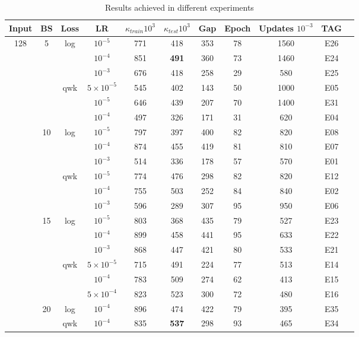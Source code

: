 \documentclass{IOS-Book-Article}
\begin{document}
\begin{table}[h!]
	\centering
	\caption{Results achieved in different experiments}
	\label{tab:qwk_cv}
	\begin{tabular}{c|c|c|c|c|c|c|c|c|c|c}
		Input & BS & Loss & LR	& $\kappa_{train} 10^3$ & $\kappa_{test} 10^3$ & Gap & Epoch & Updates $10^{-3}$ & TAG\\	
		\hline
		\multirow{32}{*}{128} & \multirow{6}{*}{5} & \multirow{3}{*}{log} & $10^{-5}$ & 771 & 418 & 353 & 78 & 1560 & E26\\
		& & & $10^{-4}$ & 851 & \textbf{491} & 360 & 73 & 1460 & E24\\
		& & & $10^{-3}$ & 676 & 418 & 258 & 29 & 580 & E25\\\cline{3-10}
		& & \multirow{3}{*}{qwk} & $5 \times 10^{-5}$ & 545 & 402 & 143 & 50 & 1000 & E05\\
		& & & $10^{-5}$ & 646 & 439 & 207 & 70 & 1400 & E31\\
		& & & $10^{-4}$ & 497 & 326 & 171 & 31 & 620 & E04\\
		\cline{2-10}
		&\multirow{6}{*}{10} & \multirow{3}{*}{log} & $10^{-5}$ & 797 & 397 & 400 & 82 & 820 & E08\\
		& & & $10^{-4}$ & 874 & 455 & 419 & 81 & 810 & E07\\
		& & & $10^{-3}$ & 514 & 336 & 178 & 57 & 570 & E01\\\cline{3-10}
		& & \multirow{3}{*}{qwk} &  $10^{-5}$ & 774 & 476 & 298 & 82 & 820 & E12\\
		& & & $10^{-4}$ & 755 & 503 & 252 & 84 & 840 & E02\\
		& & & $10^{-3}$ & 596 & 289 & 307 & 95 & 950 & E06\\
		\cline{2-10}		
		& \multirow{6}{*}{15} & \multirow{3}{*}{log} & $10^{-5}$ & 803 & 368 & 435 & 79 & 527 & E23\\
		& & & $10^{-4}$ & 899 & 458 & 441 & 95 & 633 & E22\\
		& & & $10^{-3}$ & 868 & 447 & 421 & 80 & 533 & E21\\\cline{3-10}
		& & \multirow{3}{*}{qwk} & $5\times10^{-5}$ & 715 & 491 & 224 & 77 & 513 & E14\\
		& & & $10^{-4}$ & 783 & 509 & 274 & 62 & 413 & E15\\
		& & & $5\times10^{-4}$ & 823 & 523 & 300 & 72 & 480 & E16\\
		\cline{2-10}
		& \multirow{2}{*}{20} & log & $10^{-4}$ & 896 & 474 & 422 & 79 & 395 & E35\\\cline{3-10}
		& & qwk & $10^{-4}$ & 835 & \textbf{537} & 298 & 93 & 465 & E34\\

\end{tabular}
\end{table}
\end{document}
